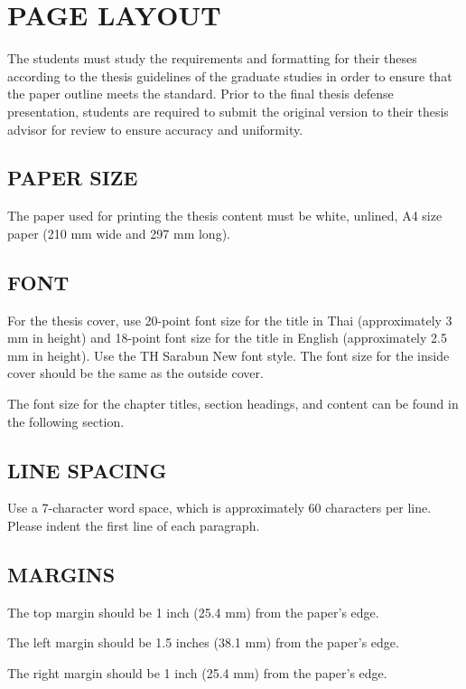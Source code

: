 \chapter{PAGE LAYOUT}

The students must study the requirements and formatting for their theses according to the thesis guidelines of the graduate studies in order to ensure that the paper outline meets the standard. Prior to the final thesis defense presentation, students are required to submit the original version to their thesis advisor for review to ensure accuracy and uniformity.

\section{PAPER SIZE}

The paper used for printing the thesis content must be white, unlined, A4 size paper (210 mm wide and 297 mm long).

\section{FONT}

For the thesis cover, use 20-point font size for the title in Thai (approximately 3 mm in height) and 18-point font size for the title in English (approximately 2.5 mm in height). Use the TH Sarabun New font style. The font size for the inside cover should be the same as the outside cover.

The font size for the chapter titles, section headings, and content can be found in the following section.

\section{LINE SPACING}

Use a 7-character word space, which is approximately 60 characters per line. Please indent the first line of each paragraph.

\section{MARGINS}

The top margin should be 1 inch (25.4 mm) from the paper's edge.

The left margin should be 1.5 inches (38.1 mm) from the paper's edge.

The right margin should be 1 inch (25.4 mm) from the paper's edge.

